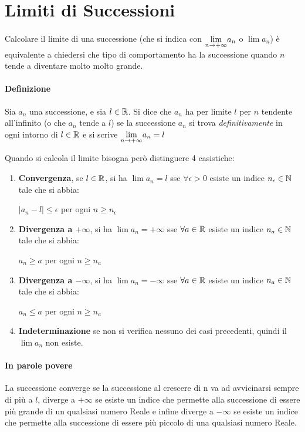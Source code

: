 \documentclass[12pt, a4paper, openany]{book}
\begin{document}
\section{Limiti di Successioni}
\paragraph*{}Calcolare il limite di una successione (che si indica con $\underset{n \to +\infty}{\lim}a_n$ o $\lim a_n$)
è equivalente a chiedersi che tipo di comportamento ha la successione quando $n$ tende a diventare molto molto grande.

\paragraph*{Definizione} Sia $a_n$ una successione, e sia $l \in \mathbb{R}$.
Si dice che $a_n$ ha per limite $l$ per $n$ tendente all'infinito (o che $a_n$ tende a $l$)
se la successione $a_n$ si trova \emph{definitivamente} in ogni intorno di $l \in \mathbb{R}$
e si scrive $\underset{n \to +\infty}{\lim} a_n = l$

Quando si calcola il limite bisogna però distinguere 4 casistiche:
\begin{enumerate}
	\item \textbf{Convergenza}, se $l\in\mathbb{R}$, si ha $\lim a_n = l$ sse $\forall \epsilon > 0$ esiste un indice $n_\epsilon\in\mathbb{N}$ tale che si abbia:
	      \begin{center}
		      $|a_n-l|\leq\epsilon$ per ogni $n \geq n_\epsilon$
	      \end{center}
	\item \textbf{Divergenza a $+\infty$}, si ha $\lim a_n = +\infty$ sse $\forall a\in \mathbb{R}$ esiste un indice $n_a\in\mathbb{N}$ tale che si abbia:
	      \begin{center}
		      $a_n\geq a$ per ogni $n \geq n_a$
	      \end{center}
	\item \textbf{Divergenza a $-\infty$}, si ha $\lim a_n = -\infty$ sse $\forall a\in \mathbb{R}$ esiste un indice $n_a\in\mathbb{N}$ tale che si abbia:
	      \begin{center}
		      $a_n\leq a$ per ogni $n \geq n_a$
	      \end{center}
	\item \textbf{Indeterminazione} se non si verifica nessuno dei casi precedenti, quindi il $\lim a_n$ non esiste.
\end{enumerate}
\paragraph*{In parole povere} La successione converge se la successione al crescere di n va ad avvicinarsi sempre di più a $l$,
diverge a $+\infty$ se esiste un indice che permette alla successione di essere più grande di un qualsiasi numero Reale
e infine diverge a $-\infty$ se esiste un indice che permette alla successione di essere più piccolo di una qualsiasi numero Reale.
\end{document}
